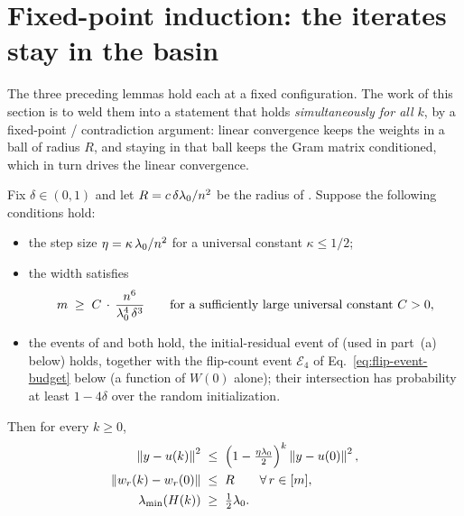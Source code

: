 \section{Fixed-point induction: the iterates stay in the basin}\label{sec:main-induction}

The three preceding lemmas hold each at a fixed configuration. The work of this section is to
weld them into a statement that holds \emph{simultaneously for all $k$}, by a
fixed-point / contradiction argument: linear convergence keeps the weights in a ball of radius
$R$, and staying in that ball keeps the Gram matrix conditioned, which in turn drives the
linear convergence.

\begin{lemma}\label{lem:main}
Fix $\delta \in (0,1)$ and let $R = c\,\delta\lambda_{0}/n^2$ be the radius of
. Suppose the following conditions hold:
\begin{itemize}[leftmargin=2em, itemsep=0.2em]
    \item the step size $\eta = \kappa\,\lambda_{0} / n^2$ for a universal constant $\kappa \le 1/2$;
    \item the width satisfies
    \begin{align}\label{eq:width-main}
    m \;\ge\; C\, \cdot\, \frac{n^6}{\lambda_{0}^4\,\delta^3}
    \qquad\text{for a sufficiently large universal constant } C > 0,
    \end{align}
    \item the events of  and  both hold,
    the initial-residual event of  (used in part~(a) below) holds,
    together with the flip-count event $\mathcal{E}_4$ of Eq.~\eqref{eq:flip-event-budget}
    below (a function of $W(0)$ alone); their intersection has probability at least
    $1 - 4\delta$ over the random initialization.
\end{itemize}
Then for every $k \ge 0$,
\begin{align}
\left\|  y - u(k)  \right\|^2 &\;\le\; \left( 1 - \tfrac{\eta\lambda_{0}}{2} \right)^{k} \left\|  y - u(0)  \right\|^2,
\label{eq:main-conv} \\
\left\|  w_r(k) - w_r(0)  \right\| &\;\le\; R \qquad \forall\, r \in [m],
\label{eq:main-stay} \\
\lambda_{\min}\!\left( H(k) \right) &\;\ge\; \tfrac12\lambda_{0} .
\label{eq:main-gram}
\end{align}
\end{lemma}

